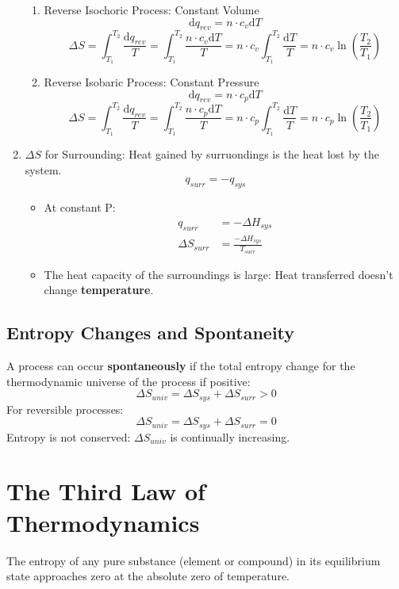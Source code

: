 \documentclass[10pt]{article}
\newcommand{\der}{\text{d}}
\begin{document}
\begin{enumerate}
    \begin{enumerate}
        \item Reverse Isochoric Process: Constant Volume
        \[\der q_{rev} = n \cdot c_v \der T\]
        \[\Delta S = \int_{T_1}^{T_2} \frac{\der q_{rev}}{T} = \int_{T_1}^{T_2} \frac{n \cdot c_v \der T}{T} = n \cdot c_v \int_{T_1}^{T_2} \frac{\der T}{T} = n \cdot c_v \ln \left(\frac{T_2}{T_1}\right)\]
        \item Reverse Isobaric Process: Constant Pressure
        \[\der q_{rev} = n \cdot c_p \der T\]
        \[\Delta S = \int_{T_1}^{T_2} \frac{\der q_{rev}}{T} = \int_{T_1}^{T_2} \frac{n \cdot c_p \der T}{T} = n \cdot c_p \int_{T_1}^{T_2} \frac{\der T}{T} = n \cdot c_p \ln \left(\frac{T_2}{T_1}\right)\]
    \end{enumerate}
    \item $\Delta S$ for Surrounding: Heat gained by surruondings is the heat lost by the system.
    \[q_{surr} = -q_{sys}\]
    \begin{itemize}
        \item At constant P:
        \begin{align*}
            q_{surr} &= -\Delta H_{sys} \\
            \Delta S_{surr} &= \frac{-\Delta H_{sys}}{T_{surr}}
        \end{align*}
        \item The heat capacity of the surroundings is large: Heat transferred doesn't change \textbf{temperature}.
    \end{itemize}
\end{enumerate}
\subsection*{Entropy Changes and Spontaneity}
A process can occur \textbf{spontaneously} if the total entropy change for the thermodynamic universe of the process if positive:
\[\Delta S_{univ} = \Delta S_{sys} + \Delta S_{surr} > 0\]
For reversible processes:
\[\Delta S_{univ} = \Delta S_{sys} + \Delta S_{surr} = 0\]
Entropy is not conserved: $\Delta S_{univ}$ is continually increasing.

\section*{The Third Law of Thermodynamics}
The entropy of any pure substance (element or compound) in its equilibrium state approaches zero at the absolute zero of temperature.
\end{document}
